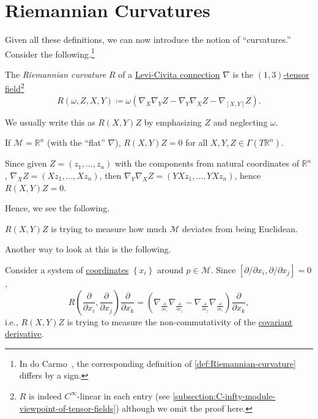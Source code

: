 \section{Riemannian Curvatures}
Given all these definitions, we can now introduce the notion of ``curvatures.'' Consider the following.\footnote{In do Carmo~\cite{flaherty2013riemannian}, the corresponding definition of \autoref{def:Riemannian-curvature} differs by a sign.}

\begin{definition}\label{def:Riemannian-curvature}
	The \emph{Riemannian curvature} \(R\) of a \hyperref[def:Levi-Civita-connection]{Levi-Civita connection} \(\nabla \) is the \hyperref[def:tensor-field]{\((1, 3)\)-tensor field}\footnote{\(R\) is indeed \(C^{\infty} \)-linear in each entry (see \autoref{subsection:C-infty-module-viewpoint-of-tensor-fields}) although we omit the proof here.}
	\[
		R(\omega , Z, X, Y) \coloneqq \omega \left( \nabla _X \nabla _Y Z - \nabla _Y \nabla _X Z - \nabla _{[X, Y]}Z \right) .
	\]
\end{definition}

\begin{notation}
	We usually write this as \(R(X, Y)Z\) by emphasizing \(Z\) and neglecting \(\omega \).
\end{notation}

\begin{eg}
	If \(\mathcal{M} = \mathbb{R} ^n\) (with the ``flat'' \(\nabla\)), \(R(X, Y)Z = 0\) for all \(X, Y, Z \in \Gamma (T \mathbb{R} ^n)\).
\end{eg}
\begin{explanation}
	Since given \(Z=(z_1, \dots , z_n)\) with the components from natural coordinates of \(\mathbb{R} ^n\), \(\nabla _X Z = (Xz_1, \dots , Xz_n)\), then \(\nabla _Y \nabla _X Z = (YX z_1, \dots , YXz_n)\), hence \(R(X, Y)Z = 0\).
\end{explanation}

Hence, we see the following.

\begin{intuition}
	\(R(X, Y)Z\) is trying to measure how much \(\mathcal{M} \) deviates from being Euclidean.
\end{intuition}

Another way to look at this is the following.

\begin{intuition}\label{int:lec10}
	Consider a system of \hyperref[def:local-coordinate]{coordinates} \(\left\{ x_i \right\} \) around \(p\in \mathcal{M} \). Since \([\partial / \partial x_i , \partial / \partial x_j] = 0\),
	\[
		R\left( \frac{\partial }{\partial x_i} , \frac{\partial }{\partial x_j} \right) \frac{\partial }{\partial x_k}
		= ( \nabla _{\frac{\partial }{\partial x_i} } \nabla _{\frac{\partial }{\partial x_j} } - \nabla _{\frac{\partial }{\partial x_j} } \nabla _{\frac{\partial }{\partial x_i} } ) \frac{\partial }{\partial x_k},
	\]
	i.e., \(R(X, Y)Z\) is trying to measure the non-commutativity of the \hyperref[def:covariant-derivative]{covariant derivative}.
\end{intuition}

